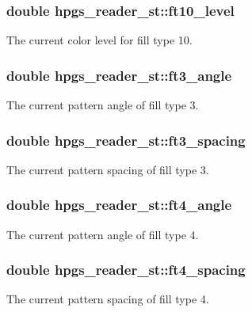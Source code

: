 \subsubsection[{ft10\_\-level}]{\setlength{\rightskip}{0pt plus 5cm}double {\bf hpgs\_\-reader\_\-st::ft10\_\-level}}\label{structhpgs__reader__st_a37d720ec49a859770409af8e05301441}
The current color level for fill type 10. 
\subsubsection[{ft3\_\-angle}]{\setlength{\rightskip}{0pt plus 5cm}double {\bf hpgs\_\-reader\_\-st::ft3\_\-angle}}\label{structhpgs__reader__st_a9856de831974f3500f7eb5462cce2faa}
The current pattern angle of fill type 3. 
\subsubsection[{ft3\_\-spacing}]{\setlength{\rightskip}{0pt plus 5cm}double {\bf hpgs\_\-reader\_\-st::ft3\_\-spacing}}\label{structhpgs__reader__st_a916601d74af1abf7065a2d441851fa0e}
The current pattern spacing of fill type 3. 
\subsubsection[{ft4\_\-angle}]{\setlength{\rightskip}{0pt plus 5cm}double {\bf hpgs\_\-reader\_\-st::ft4\_\-angle}}\label{structhpgs__reader__st_a40a2ac5fb645b3daf000d9b383a5850a}
The current pattern angle of fill type 4. 
\subsubsection[{ft4\_\-spacing}]{\setlength{\rightskip}{0pt plus 5cm}double {\bf hpgs\_\-reader\_\-st::ft4\_\-spacing}}\label{structhpgs__reader__st_a28128eaea4f8510044d186406cc927df}
The current pattern spacing of fill type 4. 
